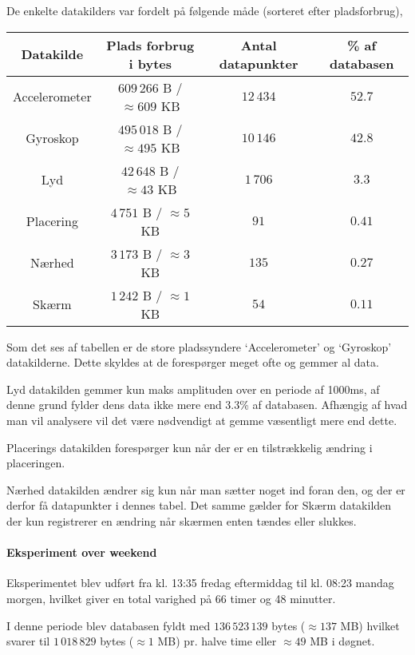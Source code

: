 De enkelte datakilders var fordelt på følgende måde (sorteret efter pladsforbrug),

\begin{tabular}{|c|c|c|c|}
	\hline Datakilde		& Plads forbrug i bytes				& Antal datapunkter  & \% af databasen \\
	\hline Accelerometer 	& $609\,266$ B / $\approx609$ KB	& $12\,434$ 		 & $52.7$ \\ 
	\hline Gyroskop 		& $495\,018$ B / $\approx495$ KB	& $10\,146$ 		 & $42.8$\\ 
	\hline Lyd 				& $42\,648$ B / $\approx43$ KB		& $1\,706$ 			 & $3.3$ \\ 
	\hline Placering 		& $4\,751$ B / $\approx5$ KB		& $91$ 				 & $0.41$ \\ 
	\hline Nærhed    		& $3\,173$ B / $\approx3$ KB		& $135$ 			 & $0.27$ \\ 
	\hline Skærm 			& $1\,242$ B / $\approx1$	KB		& $54$				 & $0.11$ \\ 
	\hline 
\end{tabular} 

Som det ses af tabellen er de store pladssyndere `Accelerometer' og `Gyroskop' datakilderne.
Dette skyldes at de forespørger meget ofte og gemmer al data.

Lyd datakilden gemmer kun maks amplituden over en periode af 1000ms, af denne grund fylder dens data ikke mere end 3.3\% af databasen.
Afhængig af hvad man vil analysere vil det være nødvendigt at gemme væsentligt mere end dette.

Placerings datakilden forespørger kun når der er en tilstrækkelig ændring i placeringen.

Nærhed datakilden ændrer sig kun når man sætter noget ind foran den, og der er derfor få datapunkter i dennes tabel.
Det samme gælder for Skærm datakilden der kun registrerer en ændring når skærmen enten tændes eller slukkes.	

\paragraph{Eksperiment over weekend}
Eksperimentet blev udført fra kl. 13:35 fredag eftermiddag til kl. 08:23 mandag morgen, hvilket giver en total varighed på 66 timer og 48 minutter.

I denne periode blev databasen fyldt med  $136\,523\,139$ bytes ($\approx137$ MB) hvilket svarer til $1\,018\,829$ bytes ($\approx1$ MB) pr. halve time eller $\approx49$ MB i døgnet.

